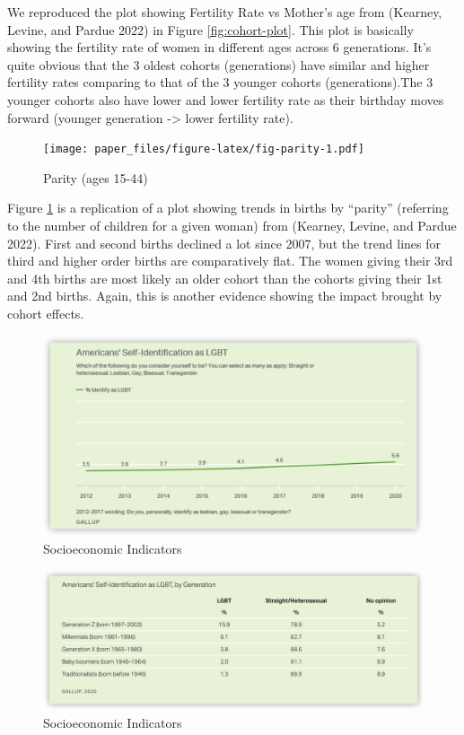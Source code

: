 \documentclass[
]{article}
\begin{document}
We reproduced the plot showing Fertility Rate vs Mother's age from (Kearney, Levine, and Pardue 2022) in Figure \ref{fig:cohort-plot}. This plot is basically showing the fertility rate of women in different ages across 6 generations.
It's quite obvious that the 3 oldest cohorts (generations) have similar and higher fertility rates comparing to that of the 3 younger cohorts (generations).The 3 younger cohorts also have lower and lower fertility rate as their birthday moves forward (younger generation -\textgreater{} lower fertility rate).

\begin{figure}
\centering
\texttt{[image: paper\_files/figure-latex/fig-parity-1.pdf]}
\caption{\label{fig:fig-parity}Parity (ages 15-44)}
\end{figure}

Figure \ref{fig:fig-parity} is a replication of a plot showing trends in births by ``parity'' (referring to the number of children for a given woman) from (Kearney, Levine, and Pardue 2022). First and second births declined a lot since 2007, but the trend lines for third and higher order births are comparatively flat.
The women giving their 3rd and 4th births are most likely an older cohort than the cohorts giving their 1st and 2nd births. Again, this is another evidence showing the impact brought by cohort effects.

\begin{figure}

{\centering \includegraphics[width=.80\linewidth]{./images/US-LGBT-percent-trend} 

}

\caption{Socioeconomic Indicators}\label{fig:fig-lgbt-trend-by-year}
\end{figure}

\begin{figure}

{\centering \includegraphics[width=.80\linewidth]{./images/LGBT-percentage-by-generation} 

}

\caption{Socioeconomic Indicators}\label{fig:fig-lgbt-by-generation}
\end{figure}
\end{document}
